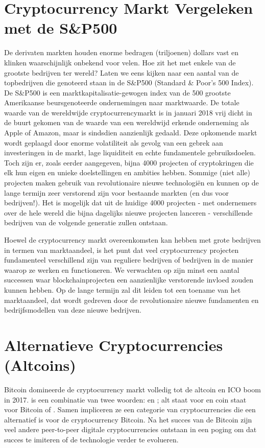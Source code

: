 \section{Cryptocurrency Markt Vergeleken met de S\&P500}
De derivaten markten houden enorme bedragen (triljoenen) dollars vast en klinken waarschijnlijk onbekend voor velen. Hoe zit het met enkele van de grootste bedrijven ter wereld? Laten we eens kijken naar een aantal van de topbedrijven die genoteerd staan in de S\&P500 (Standard \& Poor's 500 Index). De S\&P500 is een marktkapitalisatie-gewogen index van de 500 grootste Amerikaanse beursgenoteerde ondernemingen naar marktwaarde. De totale waarde van de wereldwijde cryptocurrencymarkt is in januari 2018 vrij dicht in de buurt gekomen van de waarde van een wereldwijd erkende onderneming als Apple of Amazon, maar is sindsdien aanzienlijk gedaald. Deze opkomende markt wordt geplaagd door enorme volatiliteit als gevolg van een gebrek aan investeringen in de markt, lage liquiditeit en echte fundamentele gebruiksdoelen.
Toch zijn er, zoals eerder aangegeven, bijna 4000 projecten of cryptokringen die elk hun eigen en unieke doelstellingen en ambities hebben. Sommige (niet alle) projecten maken gebruik van revolutionaire nieuwe technologi\"en en kunnen op de lange termijn zeer verstorend zijn voor bestaande markten (en dus voor bedrijven!). Het is mogelijk dat uit de huidige 4000 projecten - met ondernemers over de hele wereld die bijna dagelijks nieuwe projecten lanceren - verschillende bedrijven van de volgende generatie zullen ontstaan.\medskip 

Hoewel de cryptocurrency markt overeenkomsten kan hebben met grote bedrijven in termen van marktaandeel, is het punt dat veel cryptocurrency projecten fundamenteel verschillend zijn van reguliere bedrijven of bedrijven in de manier waarop ze werken en functioneren. We verwachten op zijn minst een aantal successen waar blockchainprojecten een aanzienlijke verstorende invloed zouden kunnen hebben. Op de lange termijn zal dit leiden tot een toename van het marktaandeel, dat wordt gedreven door de revolutionaire nieuwe fundamenten en bedrijfsmodellen van deze nieuwe bedrijven.

\section{Alternatieve Cryptocurrencies (Altcoins)}
Bitcoin domineerde de cryptocurrency markt volledig tot de altcoin en ICO boom in 2017.   is een combinatie van twee woorden:  en ; alt staat voor  en coin staat voor Bitcoin of . Samen impliceren ze een categorie van cryptocurrencies die een alternatief is voor de cryptocurrency Bitcoin. Na het succes van de Bitcoin zijn veel andere peer-to-peer digitale cryptocurrencies ontstaan in een poging om dat succes te imiteren of de technologie verder te evolueren. 

